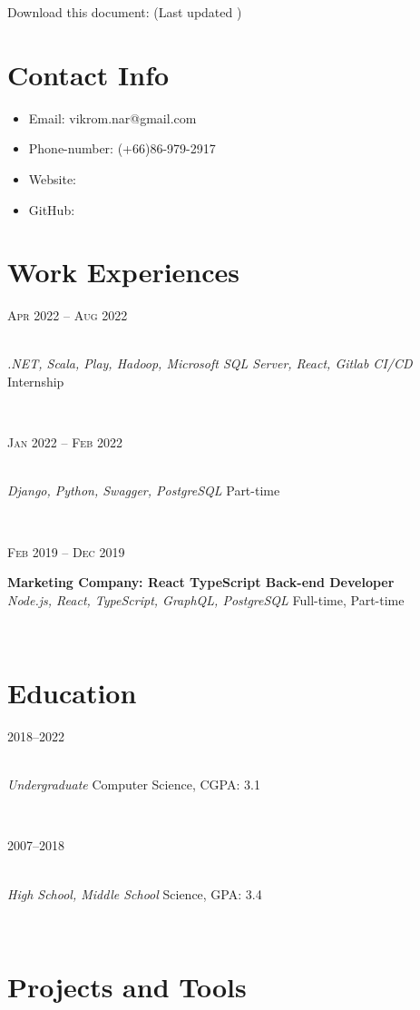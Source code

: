 \documentclass[letterpaper, 10pt]{article}
\author{Vikrom Narula}
\date{\today}
\let\oldhref\href
\renewcommand{\href}[3][blue]{\oldhref{#2}{\color{#1}{#3}}}
\renewcommand{\maketitle}{
    \hspace{.25\textwidth}
    \begin{minipage}[t]{.5\textwidth}
        \par{\centering{\Huge  \bfseries{\theauthor}}\par}
    \end{minipage}
    \begin{minipage}[t]{.25\textwidth}{
        \footnotesize\hfill{}\color{gray}
        \hfill{}Download this document:
        \href[gray]{https://raw.githubusercontent.com/narula2000/Resume/main/cv.pdf}{Here}
        \hfill{}(Last updated \thedate)
    }
    \end{minipage}
}
\newcommand{\entry}[4]{
    \begin{minipage}[t]{.18 \linewidth}
        \hfill \textsc{#1}
    \end{minipage}
    \hfill \vline \hfill
    \begin{minipage}[t]{.80 \linewidth}
        {\bf#2} \\ \textit{#3} \footnotesize{#4}
    \end{minipage} \\
    \vspace{.2cm}
}%
\begin{document}
\maketitle

\section{Contact Info}
\begin{multicols}{2}
  \begin{itemize}
    \item Email: vikrom.nar@gmail.com
    \item Phone-number: (+66)86-979-2917
    \item Website: \href{https://narula2000.github.io/}{narula2000.github.io}
    \item GitHub: \href{https://github.com/narula2000}{github.com/narula2000}
  \end{itemize}
\end{multicols}

\section{Work Experiences}

\entry{Apr 2022 -- Aug 2022}
  {\href{https://www.agoda.com/}{Agoda: Back-end Developer Intern Team}}
  {.NET, Scala, Play, Hadoop, Microsoft SQL Server, React, Gitlab CI/CD}
  {Internship}


\entry{Jan 2022 -- Feb 2022}
  {\href{https://thegang.tech/?lang=en}{The Gang Technology: Django Python Back-end Developer}}
  {Django, Python, Swagger, PostgreSQL}
  {Part-time}


\entry{Feb 2019 -- Dec 2019}
  {Marketing Company: React TypeScript Back-end Developer}
  {Node.js, React, TypeScript, GraphQL, PostgreSQL}
  {Full-time, Part-time}

\section{Education}

\entry{2018--2022}
  {\href{https://muic.mahidol.ac.th/eng}{Mahidol University International College}}
  {Undergraduate}
  {Computer Science, CGPA: 3.1}

\entry{2007--2018}
  {\href{https://www.repsbanchang.com}{Rayong English Programme School}}
  {High School, Middle School}
  {Science, GPA: 3.4}

\section{Projects and Tools}
\end{document}
